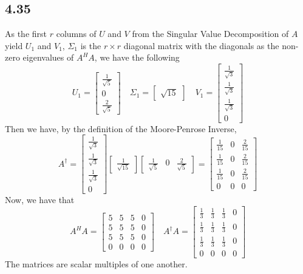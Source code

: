 \documentclass[letterpaper,12pt]{article}
\theoremstyle{definition}
\begin{document}
\subsection*{4.35}
As the first $r$ columns of $U$ and $V$ from the Singular Value Decomposition of $A$ yield $U_1$ and $V_1$, $\Sigma_1$ is the $r \times r$ diagonal matrix with the diagonals as the non-zero eigenvalues of $A^HA$, we have the following
\[ 
U_1 = 
\begin{bmatrix} \frac{1}{\sqrt{5}} \\ 0 \\ \frac{2}{\sqrt{5}} \end{bmatrix}
\quad
\Sigma_1 = 
\begin{bmatrix} \sqrt{15} \end{bmatrix}
\quad
V_1 = 
\begin{bmatrix} \frac{1}{\sqrt{3}}\\ \frac{1}{\sqrt{3}} \\ \frac{1}{\sqrt{3}}\\0 \end{bmatrix}
\]
Then we have, by the definition of the Moore-Penrose Inverse,
\[   
A^{\dagger} =
    \begin{bmatrix} \frac{1}{\sqrt{3}}\\ \frac{1}{\sqrt{3}} \\ \frac{1}{\sqrt{3}}\\0 \end{bmatrix}
    \begin{bmatrix} \frac{1}{\sqrt{15}} \end{bmatrix}
    \begin{bmatrix} \frac{1}{\sqrt{5}} & 0 & \frac{2}{\sqrt{5}} \end{bmatrix}
=
\begin{bmatrix} 
    \frac{1}{15} & 0 & \frac{2}{15} \\
    \frac{1}{15} & 0 & \frac{2}{15} \\
    \frac{1}{15} & 0 & \frac{2}{15} \\
    0 & 0 & 0 
\end{bmatrix}
\]
Now, we have that
\[
A^HA=\begin{bmatrix}
    5&5&5&0\\
    5&5&5&0\\
    5&5&5&0\\
    0&0&0&0
\end{bmatrix}
\quad
A^{\dagger}A=\begin{bmatrix}
    \frac{1}{3} & \frac{1}{3} & \frac{1}{3} & 0 \\
    \frac{1}{3} & \frac{1}{3} & \frac{1}{3} & 0 \\
    \frac{1}{3} & \frac{1}{3} & \frac{1}{3} & 0 \\
    0&0&0&0
\end{bmatrix}
\]
The matrices are scalar multiples of one another.
\end{document}
